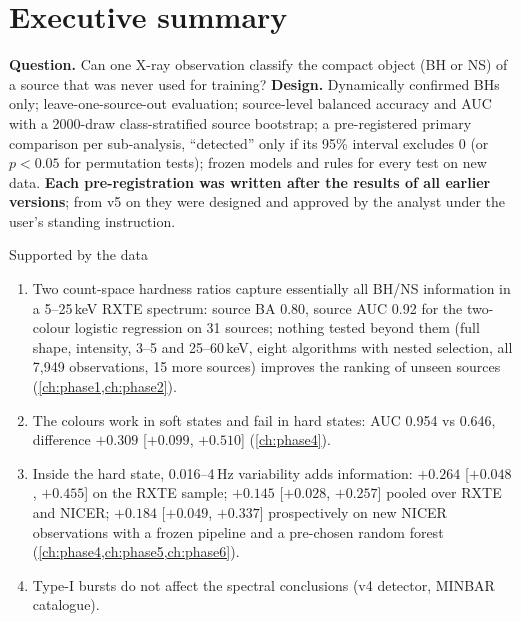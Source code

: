 \chapter*{Executive summary}
\textbf{Question.} Can one X-ray observation classify the compact object (BH or NS) of a source that was never used for training?
\textbf{Design.} Dynamically confirmed BHs only; leave-one-source-out evaluation; source-level balanced accuracy and AUC with a
2000-draw class-stratified source bootstrap; a pre-registered primary comparison per sub-analysis, ``detected'' only if its 95\% interval
excludes 0 (or $p<0.05$ for permutation tests); frozen models and rules for every test on new data. \textbf{Each pre-registration was written
after the results of all earlier versions}; from v5 on they were designed and approved by the analyst under the user's standing
instruction.

\begin{keybox}{Supported by the data}
\begin{enumerate}
\item Two count-space hardness ratios capture essentially all BH/NS information in a 5--25\,keV RXTE spectrum: source BA 0.80, source AUC 0.92
for the two-colour logistic regression on 31 sources; nothing tested beyond them (full shape, intensity, 3--5 and 25--60\,keV, eight
algorithms with nested selection, all 7,949 observations, 15 more sources) improves the ranking of unseen sources (\cref{ch:phase1,ch:phase2}).
\item The colours work in soft states and fail in hard states: AUC 0.954 vs 0.646, difference $+0.309$ [$+0.099$, $+0.510$] (\cref{ch:phase4}).
\item Inside the hard state, 0.016--4\,Hz variability adds information: $+0.264$ [$+0.048$, $+0.455$] on the RXTE sample; $+0.145$ [$+0.028$, $+0.257$]
pooled over RXTE and NICER; $+0.184$ [$+0.049$, $+0.337$] prospectively on new NICER observations with a frozen pipeline and a pre-chosen
random forest (\cref{ch:phase4,ch:phase5,ch:phase6}).
\item Type-I bursts do not affect the spectral conclusions (v4 detector, MINBAR catalogue).
\end{enumerate}
\end{keybox}


